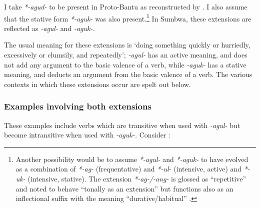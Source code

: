 \documentclass[output=paper		  ]{langscibook}
\begin{document}
{I take} {\textit{*-agud-}} {to be present in Proto-Bantu as reconstructed by \citet[144]{Guthrie1971}. I also assume that the stative form} {\textit{*-aguk-}} {was also present.}\footnote{ {Another possibility would be to assume \textit{*-agul-} and \textit{*-aguk-} to have evolved as a combination of \textit{*-ag-} (frequentative) and \textit{*-ul-} (intensive, active) and \textit{*-uk-} (intensive, stative). The extension \textit{*-ag-/-ang-} is glossed as “repetitive” and noted to behave “tonally as an extension” but functions also as an inflectional suffix with the meaning “durative/habitual” \citep[72]{Schadeberg2003}.}} {In Sumbwa, these extensions are reflected as} {\textit{{}-agul-}} {and} {\textit{{}-aguk-.}} 

{The usual meaning for these extensions is ‘doing something quickly or hurriedly, excessively or clumsily, and repeatedly’;} {\textit{{}-agul-}} {has an active meaning, and does not add any argument to the basic valence of a verb, while} {\textit{{}-aguk-}} {has a stative meaning, and deducts an argument from the basic valence of a verb. The various contexts in which these extensions occur are spelt out below.}

\subsubsection{Examples involving both extensions}\label{sec:kahigi:2.10.1}

{These examples include verbs which are transitive when used with} {\textit{{}-agul-}} {but become intransitive when used with} {\textit{{}-aguk-.}} {Consider :}
\end{document}
